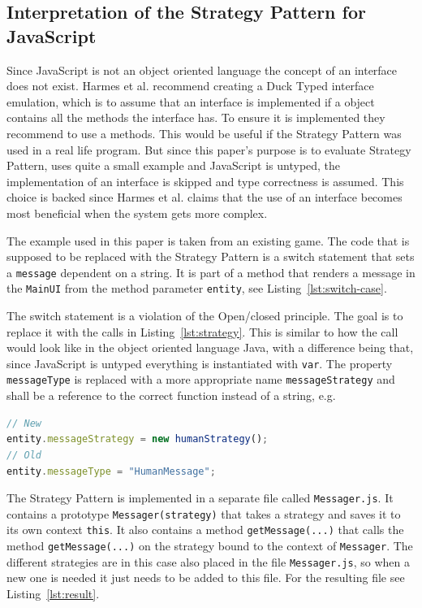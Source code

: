\documentclass[conference, a4paper]{IEEEtran}
\begin{document}
\subsection{Interpretation of the Strategy Pattern for JavaScript}
\label{sec:JavaScript}
Since JavaScript is not an object oriented language the concept of an interface does not exist. Harmes et al. recommend creating a Duck Typed interface emulation, which is to assume that an interface is implemented if a object contains all the methods the interface has. To ensure it is implemented they recommend to use a methods. This would be useful if the Strategy Pattern was used in a real life program. But since this paper's purpose is to evaluate Strategy Pattern, uses quite a small example and JavaScript is untyped, the implementation of an interface is skipped and type correctness is assumed. This choice is backed since Harmes et al. claims that the use of an interface becomes most beneficial when the system gets more complex.~\cite{bibitem:DiazHarmes}

The example used in this paper is taken from an existing game. The code that is supposed to be replaced with the Strategy Pattern is a switch statement that sets a \texttt{message} dependent on a string. It is part of a method that renders a message in the \texttt{MainUI} from the method parameter \texttt{entity}, see Listing~\ref{lst:switch-case}.

The switch statement is a violation of the Open/closed principle. The goal is to replace it with the calls in Listing~\ref{lst:strategy}. This is similar to how the call would look like in the object oriented language Java, with a difference being that, since JavaScript is untyped everything is instantiated with \texttt{var}. The property \texttt{messageType} is replaced with a more appropriate name \texttt{messageStrategy} and shall be a reference to the correct function instead of a string, e.g.

\begin{lstlisting}[language=JavaScript]
// New
entity.messageStrategy = new humanStrategy();
// Old
entity.messageType = "HumanMessage";
\end{lstlisting}

The Strategy Pattern is implemented in a separate file called \texttt{Messager.js}. It contains a prototype \texttt{Messager(strategy)} that takes a strategy and saves it to its own context \texttt{this}. It also contains a method \texttt{getMessage(...)} that calls the method \texttt{getMessage(...)} on the strategy bound to the context of \texttt{Messager}. The different strategies are in this case also placed in the file \texttt{Messager.js}, so when a new one is needed it just needs to be added to this file. For the resulting file see Listing~\ref{lst:result}.
\end{document}
